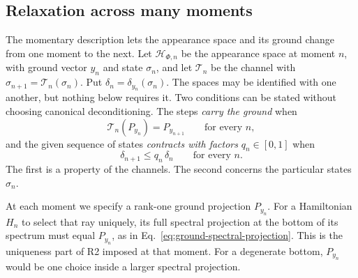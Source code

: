 \documentclass[11pt]{article}
\theoremstyle{definition}
\begin{document}
\subsection{Relaxation across many moments}
\label{subsec:relaxation-moments}
The momentary description lets the appearance space and its ground change from one moment to the next. Let $\mathcal H_{\Phi,n}$ be the appearance space at moment $n$, with ground vector $y_n$ and state $\sigma_n$, and let $\mathcal T_n$ be the channel with $\sigma_{n+1}=\mathcal T_n(\sigma_n)$. Put $\delta_n=\delta_{y_n}(\sigma_n)$. The spaces may be identified with one another, but nothing below requires it. Two conditions can be stated without choosing canonical deconditioning. The steps \emph{carry the ground} when
\begin{equation}
 \mathcal T_n(P_{y_n})=P_{y_{n+1}}\qquad\text{for every }n,
 \label{eq:relaxation-ground-carried}
\end{equation}
and the given sequence of states \emph{contracts with factors} $q_n\in[0,1]$ when
\begin{equation}
 \delta_{n+1}\le q_n\,\delta_n\qquad\text{for every }n .
 \label{eq:relaxation-contraction}
\end{equation}
The first is a property of the channels. The second concerns the particular states $\sigma_n$.

At each moment we specify a rank-one ground projection $P_{y_n}$. For a Hamiltonian $H_n$ to select that ray uniquely, its full spectral projection at the bottom of its spectrum must equal $P_{y_n}$, as in Eq.~\eqref{eq:ground-spectral-projection}. This is the uniqueness part of R2 imposed at that moment. For a degenerate bottom, $P_{y_n}$ would be one choice inside a larger spectral projection.
\end{document}
